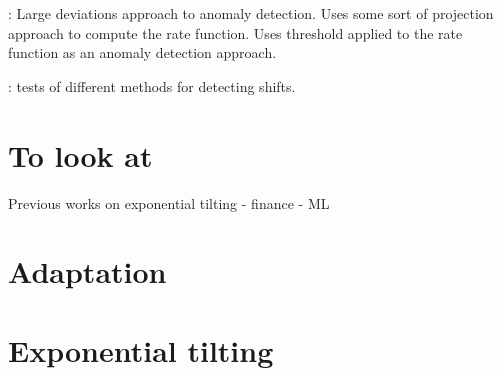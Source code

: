 \documentclass{article}[10pt]      %
\begin{document}
\cite{guggilam_anomaly_2021}: Large deviations approach to anomaly detection. Uses some sort of projection approach to compute the rate function. Uses threshold applied to the rate function as an anomaly detection approach.

\cite{rabanser_failing_2019}: tests of different methods for detecting shifts.



\section{To look at}
Previous works on exponential tilting
- finance
- ML


\section{Adaptation}




\section{Exponential tilting}








\end{document}
